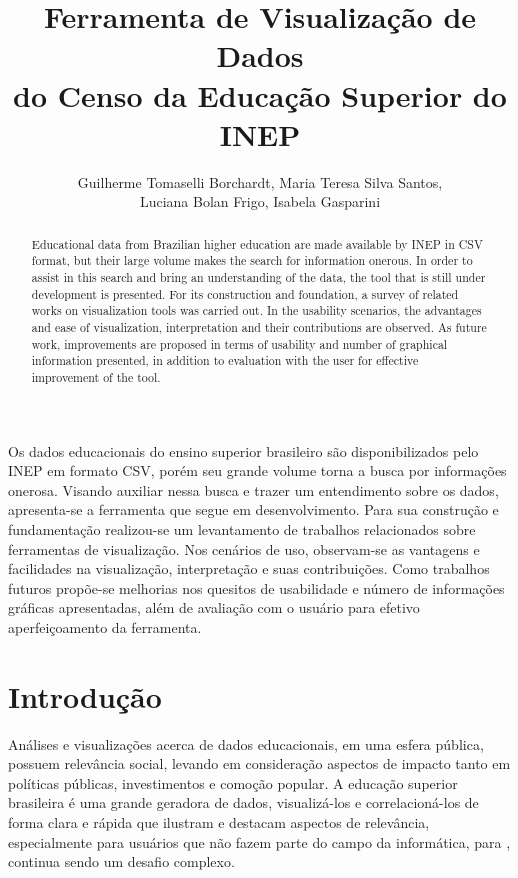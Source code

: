 \documentclass[12pt]{article}
\title{Ferramenta de Visualização de Dados\\ do Censo da Educação Superior do INEP}
\author{Guilherme Tomaselli Borchardt\inst{1}, Maria Teresa Silva Santos\inst{1},\\ Luciana Bolan Frigo\inst{2}, Isabela Gasparini\inst{1}}
\begin{document}
 

\maketitle

\begin{abstract}
  Educational data from Brazilian higher education are made available by INEP in CSV format, but their large volume makes the search for information onerous. In order to assist in this search and bring an understanding of the data, the tool that is still under development is presented. For its construction and foundation, a survey of related works on visualization tools was carried out. In the usability scenarios, the advantages and ease of visualization, interpretation and their contributions are observed. As future work, improvements are proposed in terms of usability and number of graphical information presented, in addition to evaluation with the user for effective improvement of the tool.
\end{abstract}
     
\begin{resumo} 
    Os dados educacionais do ensino superior brasileiro são disponibilizados pelo INEP em formato CSV, porém seu grande volume torna a busca por informações onerosa. Visando auxiliar nessa busca e trazer um entendimento sobre os dados, apresenta-se a ferramenta que segue em desenvolvimento. Para sua construção e fundamentação realizou-se um levantamento de trabalhos relacionados sobre ferramentas de visualização. Nos cenários de uso, observam-se as vantagens e facilidades na visualização, interpretação e suas contribuições. Como trabalhos futuros propõe-se melhorias nos quesitos de usabilidade e número de informações gráficas apresentadas, além de avaliação com o usuário para efetivo aperfeiçoamento da ferramenta. 
\end{resumo}


\section{Introdução}\label{introdução}
Análises e visualizações acerca de dados educacionais, em uma esfera pública, possuem relevância social, levando em consideração aspectos de impacto tanto em políticas públicas, investimentos e comoção popular. A educação superior brasileira é uma grande geradora de dados, visualizá-los e correlacioná-los de forma clara e rápida que ilustram e destacam aspectos de relevância, especialmente para usuários que não fazem parte do campo da informática, para \cite{marx:2013}, continua sendo um desafio complexo. 
\end{document}
